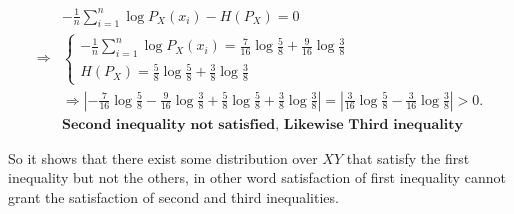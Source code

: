 \documentclass[
  course = {{EE623 Information Theory}},
  quartile = {{4}},
  assignment = 6,
  name = {{Mohammad Mahdi Rahimi}},
  studentnumber = {{20208244}},
  email = {{mahi@kaist.ac.kr}},
  firstexercise = 1
]{aga-homework}
\begin{document}
\begin{equation} \label{eq3}
\begin{split}
& -\frac{1}{n} \sum_{i=1}^{n} \log{P_{X}(x_i)} - H(P_{X}) = 0 \\
\Rightarrow & \begin{cases}
-\frac{1}{n} \sum_{i=1}^{n} \log{P_{X}(x_i)} = \frac{7}{16}\log\frac{5}{8} + \frac{9}{16}\log\frac{3}{8}\\
H(P_{X}) = \frac{5}{8}\log\frac{5}{8} + \frac{3}{8}\log\frac{3}{8}
\end{cases}\\
& \Rightarrow \left|-\frac{7}{16}\log\frac{5}{8} - \frac{9}{16}\log\frac{3}{8} + \frac{5}{8}\log\frac{5}{8} + \frac{3}{8}\log\frac{3}{8}\right| = \left|\frac{3}{16}\log\frac{5}{8} - \frac{3}{16}\log\frac{3}{8} \right| > 0.\\
&\textbf{Second inequality not satisfied, Likewise Third inequality}
\end{split}
\end{equation}

So it shows that there exist some distribution over $XY$ that satisfy the first inequality but not the others, in other word satisfaction of first inequality cannot grant the satisfaction of second and third inequalities. 
\end{document}
